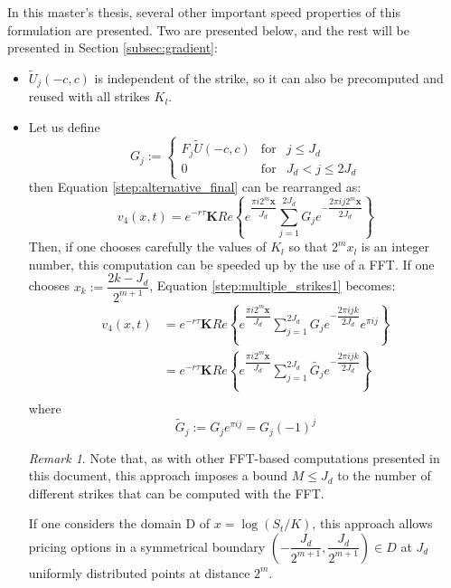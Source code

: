 \documentclass[12,twoside]{mammeTFM}
\theoremstyle{definition}
\theoremstyle{remark}
\newtheorem{remark}[thm]{Remark}
\begin{document}
In this master's thesis, several other important speed properties of this formulation are presented. Two are presented below, and the rest will be presented in Section \ref{subsec:gradient}:
\begin{itemize}
\item $\tilde{U}_j(-c, c)$ is independent of the strike, so it can also be precomputed and reused with all strikes $K_l$.
\item Let us define
\begin{equation} 
G_j := \left\{ \begin{array}{rcl} F_j \tilde{U}(-c, c) & \mbox{for} & j \leq J_d \\
 0 & \mbox{for} & J_d < j \leq 2 J_d \end{array}\right.
\end{equation}
then Equation \ref{step:alternative_final} can be rearranged as:
\begin{equation}\label{step:multiple_strikes1}
v_4(x, t) = e^{-r\tau}\boldsymbol{K} Re \left\{e^{\dfrac{\pi i 2^m \boldsymbol{x}}{J_d}} \sum_{j=1}^{2J_d} G_j e^{- \dfrac{2\pi i j 2^m \boldsymbol{x}}{2J_d}} \right\}
\end{equation}
Then, if one chooses carefully the values of $K_l$ so that $2^m x_l$ is an integer number, this computation can be speeded up by the use of a FFT. If one chooses $x_k := \dfrac{2k - J_d}{2^{m+1}}$, Equation \ref{step:multiple_strikes1} becomes:
\begin{equation}\label{step:multiple_strikes2}
\begin{aligned}
v_4(x, t) & = e^{-r\tau}\boldsymbol{K} Re \left\{e^{\dfrac{\pi i 2^m \boldsymbol{x}}{J_d}} \sum_{j=1}^{2J_d} G_j e^{- \dfrac{2\pi i j k}{2J_d}} e^{\pi i j}  \right\} \\
& = e^{-r\tau}\boldsymbol{K} Re \left\{e^{\dfrac{\pi i 2^m \boldsymbol{x}}{J_d}} \sum_{j=1}^{2J_d} \tilde{G_j} e^{- \dfrac{2\pi i j k}{2J_d}} \right\} \\
\end{aligned}
\end{equation}
where 
\begin{equation}
\tilde{G}_j := G_j e^{\pi i j} = G_j (-1)^j
\end{equation}
\begin{remark}
Note that, as with other FFT-based computations presented in this document, this approach imposes a bound $M \leq J_d$ to the number of different strikes that can be computed with the FFT.
\end{remark}
If one considers the domain D of $x = \log(S_t/K)$, this approach allows pricing options in a symmetrical boundary $(-\dfrac{J_d}{2^{m+1}},\dfrac{J_d}{2^{m+1}}) \in D$ at $J_d$ uniformly distributed points at distance $2^m$.


\end{itemize}
\end{document}
